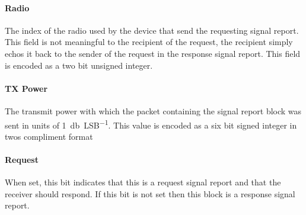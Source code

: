 \paragraph{Radio}
The index of the radio used by the device that send the requesting signal report. This field is not meaningful to the
recipient of the request, the recipient simply echos it back to the sender of the request in the response signal
report. This field is encoded as a two bit unsigned integer.

\paragraph{TX Power}
The transmit power with which the packet containing the signal report block was sent in units of \SI{1}{\decibel\per
    LSB}. This value is encoded as a six bit signed integer in twos compliment format

\paragraph{Request}
When set, this bit indicates that this is a request signal report and that the receiver should respond. If this bit is
not set then this block is a response signal report.
